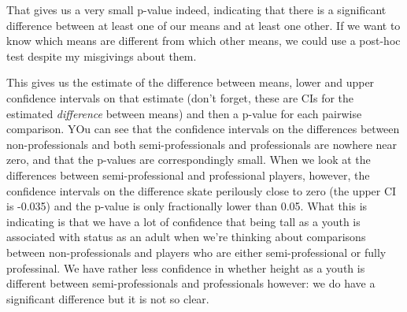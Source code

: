 \documentclass[
]{book}
\newenvironment{Shaded}{\begin{snugshade}}{\end{snugshade}}
\newcommand{\DataTypeTok}[1]{\textcolor[rgb]{0.13,0.29,0.53}{#1}}
\newcommand{\DecValTok}[1]{\textcolor[rgb]{0.00,0.00,0.81}{#1}}
\newcommand{\FloatTok}[1]{\textcolor[rgb]{0.00,0.00,0.81}{#1}}
\newcommand{\KeywordTok}[1]{\textcolor[rgb]{0.13,0.29,0.53}{\textbf{#1}}}
\newcommand{\NormalTok}[1]{#1}
\newcommand{\OperatorTok}[1]{\textcolor[rgb]{0.81,0.36,0.00}{\textbf{#1}}}
\newcommand{\StringTok}[1]{\textcolor[rgb]{0.31,0.60,0.02}{#1}}
\begin{document}
That gives us a very small p-value indeed, indicating that there is a significant difference between at least one of our means and at least one other. If we want to know which means are different from which other means, we could use a post-hoc test despite my misgivings about them.

\begin{Shaded}
\end{Shaded}

This gives us the estimate of the difference between means, lower and upper confidence intervals on that estimate (don't forget, these are CIs for the estimated \emph{difference} between means) and then a p-value for each pairwise comparison. YOu can see that the confidence intervals on the differences between non-professionals and both semi-professionals and professionals are nowhere near zero, and that the p-values are correspondingly small. When we look at the differences between semi-professional and professional players, however, the confidence intervals on the difference skate perilously close to zero (the upper CI is -0.035) and the p-value is only fractionally lower than 0.05. What this is indicating is that we have a lot of confidence that being tall as a youth is associated with status as an adult when we're thinking about comparisons between non-professionals and players who are either semi-professional or fully professinal. We have rather less confidence in whether height as a youth is different between semi-professionals and professionals however: we do have a significant difference but it is not so clear.
\end{document}
